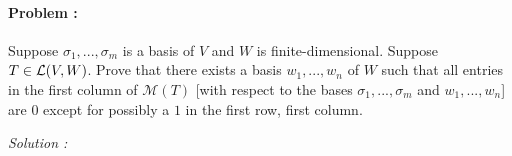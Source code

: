 \paragraph{Problem :}
Suppose \(\sigma_{1},...,\sigma_{m}\) is a basis of \(V\) and \(W\) is finite-dimensional. Suppose \(T\in\operatorname{\mathcal{L}}(V,W)\). Prove that there 
exists a basis \(w_{1},...,w_{n}\) of \(W\) such that all entries in the first column of \(\mathcal{M}(T)\) [with respect to the bases 
\(\sigma_{1},...,\sigma_{m}\) and \(w_{1},...,w_{n}\)] are \(0\) except for possibly a \(1\) in the first row, first column.

\vspace{4mm}
\textit{Solution :}






